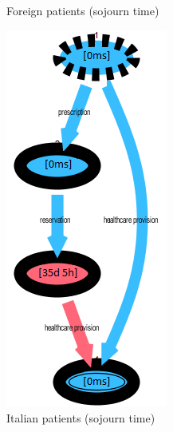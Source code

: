 \begin{figure} [htbp]
\begin{minipage}[t]{0.3\textwidth}
\caption{Foreign patients (sojourn time)}
\end{minipage}
\begin{minipage}[t]{0.3\textwidth}
\includegraphics[width=\textwidth, keepaspectratio]{AmbulatorioSojournItalians}
\caption{Italian patients (sojourn time)}
\end{minipage}
\end{figure}\\
